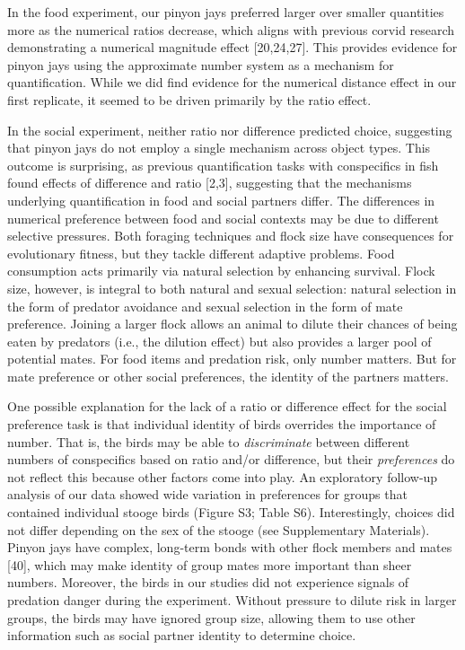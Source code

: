 \documentclass[
  ,pub,floatsintext]{apa6}
\begin{document}
In the food experiment, our pinyon jays preferred larger over smaller quantities more as the numerical ratios decrease, which aligns with previous corvid research demonstrating a numerical magnitude effect {[}20,24,27{]}. This provides evidence for pinyon jays using the approximate number system as a mechanism for quantification. While we did find evidence for the numerical distance effect in our first replicate, it seemed to be driven primarily by the ratio effect.

In the social experiment, neither ratio nor difference predicted choice, suggesting that pinyon jays do not employ a single mechanism across object types. This outcome is surprising, as previous quantification tasks with conspecifics in fish found effects of difference and ratio {[}2,3{]}, suggesting that the mechanisms underlying quantification in food and social partners differ. The differences in numerical preference between food and social contexts may be due to different selective pressures. Both foraging techniques and flock size have consequences for evolutionary fitness, but they tackle different adaptive problems. Food consumption acts primarily via natural selection by enhancing survival. Flock size, however, is integral to both natural and sexual selection: natural selection in the form of predator avoidance and sexual selection in the form of mate preference. Joining a larger flock allows an animal to dilute their chances of being eaten by predators (i.e., the dilution effect) but also provides a larger pool of potential mates. For food items and predation risk, only number matters. But for mate preference or other social preferences, the identity of the partners matters.

One possible explanation for the lack of a ratio or difference effect for the social preference task is that individual identity of birds overrides the importance of number. That is, the birds may be able to \emph{discriminate} between different numbers of conspecifics based on ratio and/or difference, but their \emph{preferences} do not reflect this because other factors come into play. An exploratory follow-up analysis of our data showed wide variation in preferences for groups that contained individual stooge birds (Figure S3; Table S6). Interestingly, choices did not differ depending on the sex of the stooge (see Supplementary Materials). Pinyon jays have complex, long-term bonds with other flock members and mates {[}40{]}, which may make identity of group mates more important than sheer numbers. Moreover, the birds in our studies did not experience signals of predation danger during the experiment. Without pressure to dilute risk in larger groups, the birds may have ignored group size, allowing them to use other information such as social partner identity to determine choice.
\end{document}
